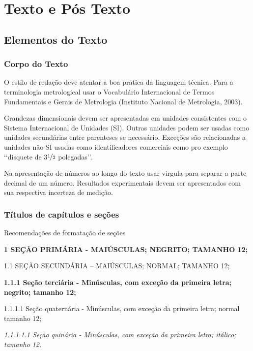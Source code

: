 \part{Texto e Pós Texto}
\chapter[Elementos do Texto]{Elementos do Texto}

\section{Corpo do Texto}

O estilo de redação deve atentar a boa prática da linguagem técnica. Para a 
terminologia metrological usar o Vocabulário Internacional de Termos 
Fundamentais e Gerais de Metrologia\cite{inmetro2003}  (Instituto Nacional de Metrologia, 
2003).

Grandezas dimensionais devem ser apresentadas em unidades consistentes com 
o Sistema Internacional de Unidades  (SI). Outras unidades podem ser usadas 
como unidades secundárias entre parenteses se necessário. Exceções são 
relacionadas a unidades não-SI usadas como identificadores comerciais como 
pro exemplo \lq\lq disquete de  3$\nicefrac{1}{2}$ polegadas\rq\rq. 

Na apresentação de números ao longo do texto usar virgula para separar a 
parte decimal de um número. Resultados experimentais devem ser apresentados 
com sua respectiva incerteza de medição.

\section{Títulos de capítulos e seções}

Recomendações de formatação de seções 

\begin{description}

	\item \textbf{1 SEÇÃO PRIMÁRIA - MAIÚSCULAS; NEGRITO; TAMANHO 12;}

	\item 1.1 SEÇÃO SECUNDÁRIA – MAIÚSCULAS; NORMAL; TAMANHO 12; 

	\item \textbf{1.1.1 Seção terciária - Minúsculas, com exceção da 
	primeira letra; negrito; tamanho 12;}

	\item 1.1.1.1 Seção quaternária - Minúsculas, com exceção da primeira 
	letra; normal tamanho 12; 

 	\item \textit{1.1.1.1.1 Seção quinária - Minúsculas, com exceção da 
	primeira letra; itálico; tamanho 12.}

\end{description}

